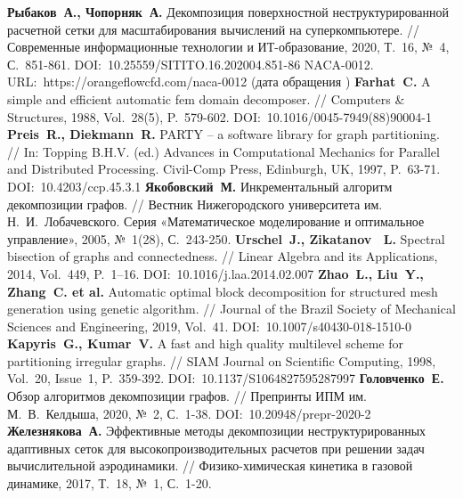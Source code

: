 \begin{thebibliography}{99}
\textbf{Рыбаков~А., Чопорняк~А.} Декомпозиция поверхностной неструктурированной расчетной сетки для масштабирования вычислений на суперкомпьютере. // Современные информационные технологии и ИТ-образование, 2020, Т.~16, №~4, С.~851-861. DOI:~10.25559/SITITO.16.202004.851-86
NACA-0012. URL:~https://orangeflowcfd.com/naca-0012 (дата обращения \StrDate)
\textbf{Farhat~C.} A simple and efficient automatic fem domain decomposer. // Computers \& Structures, 1988, Vol.~28(5), P.~579-602. DOI:~10.1016/0045-7949(88)90004-1
\textbf{Preis~R., Diekmann~R.} PARTY -- a software library for graph partitioning. // In: Topping B.H.V. (ed.) Advances in Computational Mechanics for Parallel and Distributed Processing. Civil-Comp Press, Edinburgh, UK, 1997, P.~63-71. DOI:~10.4203/ccp.45.3.1 
\textbf{Якобовский~М.} Инкрементальный алгоритм декомпозиции графов. // Вестник Нижегородского университета им. Н.~И.~Лобачевского. Серия «Математическое моделирование и оптимальное управление», 2005, №~1(28), С.~243-250.
\textbf{Urschel~J., Zikatanov~ L.} Spectral bisection of graphs and connectedness. // Linear Algebra and its Applications, 2014, Vol.~449, P.~1–16. DOI:~10.1016/j.laa.2014.02.007
\textbf{Zhao~L., Liu~Y., Zhang~C. et al.} Automatic optimal block decomposition for structured mesh generation using genetic algorithm. // Journal of the Brazil Society of Mechanical Sciences and Engineering, 2019, Vol.~41. DOI:~10.1007/s40430-018-1510-0
\textbf{Kapyris~G., Kumar~V.} A fast and high quality multilevel scheme for partitioning irregular graphs. // SIAM Journal on Scientific Computing, 1998, Vol.~20, Issue~1, P.~359-392. DOI:~10.1137/S1064827595287997
\textbf{Головченко~Е.} Обзор алгоритмов декомпозиции графов. // Препринты ИПМ им. М.~В.~Келдыша, 2020, №~2, С.~1-38. DOI:~10.20948/prepr-2020-2
\textbf{Железнякова~А.} Эффективные методы декомпозиции неструктурированных адаптивных сеток для высокопроизводительных расчетов при решении задач вычислительной аэродинамики. // Физико-химическая кинетика в газовой динамике, 2017, Т.~18, №~1, С.~1-20.


\end{thebibliography}
